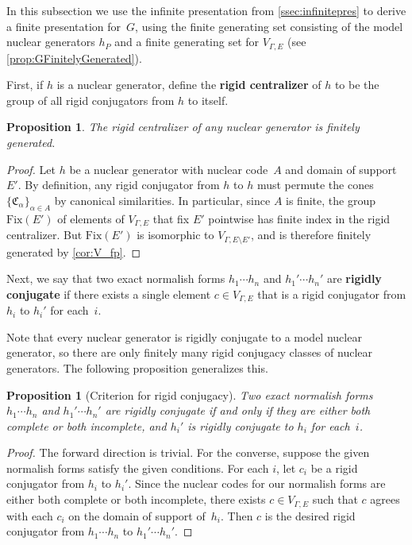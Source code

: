 \documentclass[11pt,letterpaper]{amsart}
\newtheorem{proposition}[theorem]{Proposition}
\theoremstyle{definition}
\newcommand{\newword}[1]{\textbf{#1}}
\newcommand{\C}{\mathfrak{C}}
\newcommand{\Fix}{\mathrm{Fix}}
\begin{document}
In this subsection we use the infinite presentation from \cref{ssec:infinitepres} to derive a finite presentation for~$G$, using the finite generating set consisting of the model nuclear generators $h_P$ and a finite generating set for $V_{\Gamma,E}$ (see \cref{prop:GFinitelyGenerated}).

First, if $h$ is a nuclear generator, define the \newword{rigid centralizer} of $h$ to be the group of all rigid conjugators from $h$ to itself.

\begin{proposition}\label{prop:rigid_cent_fg}
The rigid centralizer of any nuclear generator is finitely generated.
\end{proposition}

\begin{proof}
Let $h$ be a nuclear generator with nuclear code~$A$ and domain of support~$E'$.  By definition, any rigid conjugator from $h$ to $h$ must permute the cones $\{\C_\alpha\}_{\alpha\in A}$ by canonical similarities.  In particular, since $A$ is finite, the group $\Fix(E')$ of elements of $V_{\Gamma,E}$ that fix $E'$ pointwise has finite index in the rigid centralizer.  But $\Fix(E')$ is isomorphic to $V_{\Gamma,E\setminus E'}$, and is therefore finitely generated by \cref{cor:V_fp}.
\end{proof}

Next, we say that two exact normalish forms $h_1\cdots h_n$ and $h_1'\cdots h_n'$ are \newword{rigidly conjugate} if there exists a single element $c\in V_{\Gamma,E}$ that is a rigid conjugator from $h_i$ to $h_i'$ for each~$i$.

Note that every nuclear generator is rigidly conjugate to a model nuclear generator, so there are only finitely many rigid conjugacy classes of nuclear generators.  The following proposition generalizes this.

\begin{proposition}[Criterion for rigid conjugacy]\label{prop:ConjugateNormalish}
Two exact normalish forms $h_1\cdots h_n$ and $h_1'\cdots h_n'$ are rigidly conjugate if and only if they are either both complete or both incomplete, and $h_i'$ is rigidly conjugate to $h_i$ for each~$i$.
\end{proposition}

\begin{proof}The forward direction is trivial.  For the converse, suppose the given normalish forms satisfy the given conditions.  For each $i$, let $c_i$ be a rigid conjugator from $h_i$ to $h_i'$. Since the nuclear codes for our normalish forms are either both complete or both incomplete, there exists $c\in V_{\Gamma,E}$ such that $c$ agrees with each $c_i$ on the domain of support of~$h_i$.  Then $c$ is the desired rigid conjugator from $h_1\cdots h_n$ to $h_1'\cdots h_n'$.
\end{proof}
\end{document}
